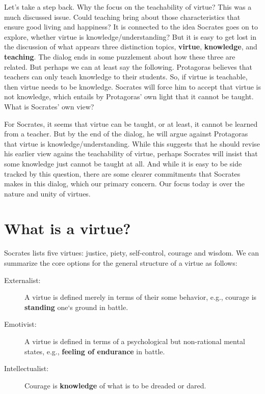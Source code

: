 \documentclass[oneside]{article}
\begin{document}
\noindent Let's take a step back. Why the focus on the teachability of virtue? This was a much discussed issue. Could teaching bring about those characteristics that ensure good living and happiness? It is connected to the idea Socrates goes on to explore, whether virtue is knowledge/understanding? But it is easy to get lost in the discussion of what appears three distinction topics, \textbf{virtue}, \textbf{knowledge}, and \textbf{teaching}. The dialog ends in some puzzlement about how these three are related. But perhaps we can at least say the following. Protagoras believes that teachers can only teach knowledge to their students. So, if virtue is teachable, then virtue needs to be knowledge. Socrates will force him to accept that virtue is not knowledge, which entails by Protagoras' own light that it cannot be taught. What is Socrates' own view? 

For Socrates, it seems that virtue can be taught, or at least, it cannot be learned from a teacher. But by the end of the dialog, he will argue against Protagoras that virtue is knowledge/understanding. While this suggests that he should revise his earlier view agains the teachability of virtue, perhaps Socrates will insist that some knowledge just cannot be taught at all. And while it is easy to be side tracked by this question, there are some clearer commitments that Socrates makes in this dialog, which our primary concern. Our focus today is over the nature and unity of virtues. 

\section*{What is a virtue?}

Socrates lists five virtues: justice, piety, self-control, courage and wisdom. We can summarize the core options for the general structure of a virtue as follows: 

\begin{description}
\item[Externalist:] A virtue is defined merely in terms of their some behavior, e.g., courage is \textbf{standing} one`s ground in battle.
\item[Emotivist:] A virtue is defined in terms of a psychological but non-rational mental states, e.g.,  \textbf{feeling of endurance} in battle.
\item[Intellectualist:] Courage is \textbf{knowledge} of what is to be dreaded or dared.
\end{description}
\end{document}
